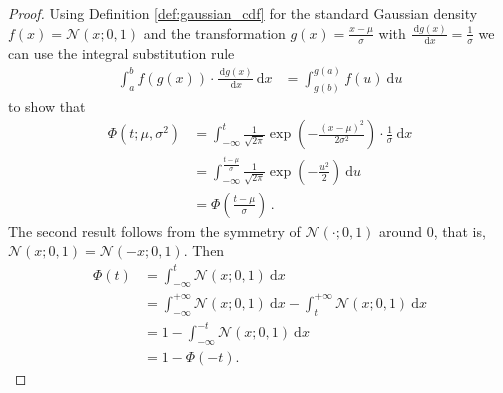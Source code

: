 \documentclass[a4paper]{article}
\newcommand{\Normal}[3]{{\mathcal N} \left({#1};{#2},{#3}\right)}
\newcommand{\NormalCDF}[3]{\Phi \left({#1};{#2},{#3}\right)}
\newcommand{\NormalStandardCDF}[1]{\Phi \left({#1}\right)}
\newcommand{\intd}[1]{\ \mathrm{d}{#1}}
\theoremstyle{definition}
\begin{document}
\begin{proof}\label{prf:properties_of_Gaussian_CDF}
    Using Definition \ref{def:gaussian_cdf} for the standard Gaussian density $f(x) = \Normal{x}{0}{1}$ and the transformation $g(x) = \frac{x - \mu}{\sigma}$ with $\frac{\intd{g(x)}}{\intd{x}} = \frac{1}{\sigma}$ we can use the integral substitution rule
    \begin{align*}
        \int_a^b f(g(x)) \cdot \frac{\intd{g(x)}}{\intd{x}}\intd{x} & = \int_{g(b)}^{g(a)} f(u)\intd{u}
    \end{align*}
    to show that
    \begin{align*}
        \NormalCDF{t}{\mu}{\sigma^2} 
        & = \int_{-\infty}^t \frac{1}{\sqrt{2\pi}} \exp\left( -\frac{\left( x - \mu \right)^2}{2\sigma^2} \right) \cdot \frac{1}{\sigma} \intd{x} \\
        & = \int_{-\infty}^{\frac{t-\mu}{\sigma}} \frac{1}{\sqrt{2\pi}} \exp\left( -\frac{u^2}{2} \right)\intd{u} \\
        & = \NormalStandardCDF{\frac{t-\mu}{\sigma}} \,.
    \end{align*}
    The second result follows from the symmetry of $\Normal{\cdot}{0}{1}$ around $0$, that is, $\Normal{x}{0}{1} = \Normal{-x}{0}{1}$. Then
    \begin{align*}
        \NormalStandardCDF{t} 
        & = \int_{-\infty}^{t} \Normal{x}{0}{1}\intd{x} \\
        & = \int_{-\infty}^{+\infty} \Normal{x}{0}{1}\intd{x} - \int_{t}^{+\infty} \Normal{x}{0}{1}\intd{x} \\
        & = 1 - \int_{-\infty}^{-t} \Normal{x}{0}{1}\intd{x} \\
        & = 1 - \NormalStandardCDF{-t} .
    \end{align*}
\end{proof}
\end{document}
